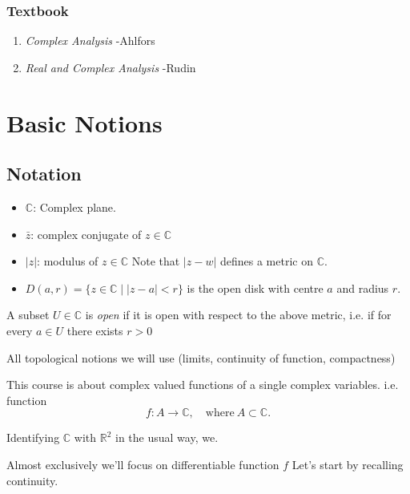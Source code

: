 \subsubsection*{Textbook}
\begin{enumerate}
    \item \textit{Complex Analysis} -Ahlfors
    \item \textit{Real and Complex Analysis} -Rudin
\end{enumerate}
\section{Basic Notions}
\subsection{Notation}
\begin{remark}
    \begin{itemize}
        \item \(\mathbb{C}\): Complex plane.
        \item \(\bar{z}\): complex conjugate of \(z \in \mathbb{C}\)
        \item \(\left\vert z \right\vert \): modulus of \(z \in \mathbb{C}\)
            Note that \(\left\vert z - w \right\vert \) defines a metric on \(\mathbb{C}\).
        \item \(D(a, r) = \{z\in \mathbb{C}\mid \left\vert z - a \right\vert <r\}\) is the open disk with centre \(a\) and radius \(r\).
    \end{itemize}
\end{remark}
\begin{definition}
    A subset \(U \in \mathbb{C}\) is \textit{open} if it is open with respect to the above metric, i.e. if for every \(a \in U\) there exists \(r > 0\) 
\end{definition}
All topological notions we will use (limits, continuity of function, compactness)

This course is about complex valued functions of a single complex variables. i.e. function
\[
    f:A\to \mathbb{C},\quad \text{where}~ A\subset \mathbb{C}.
\]
\begin{remark}
    Identifying \(\mathbb{C}\) with \(\mathbb{R}^2\) in the usual way, we.
\end{remark}

Almost exclusively we'll focus on differentiable function \(f\) Let's start by recalling continuity.

